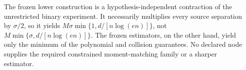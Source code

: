 The frozen lower construction is a hypothesis-independent contraction of the unrestricted binary experiment.  It necessarily multiplies every source separation by \(\sigma/2\), so it yields \(M\sigma\min\{1,d/[n\log(en)]\}\), not \(M\min\{\sigma,d/[n\log(en)]\}\).  The frozen estimators, on the other hand, yield only the minimum of the polynomial and collision guarantees.  No declared node supplies the required constrained moment-matching family or a sharper estimator.
